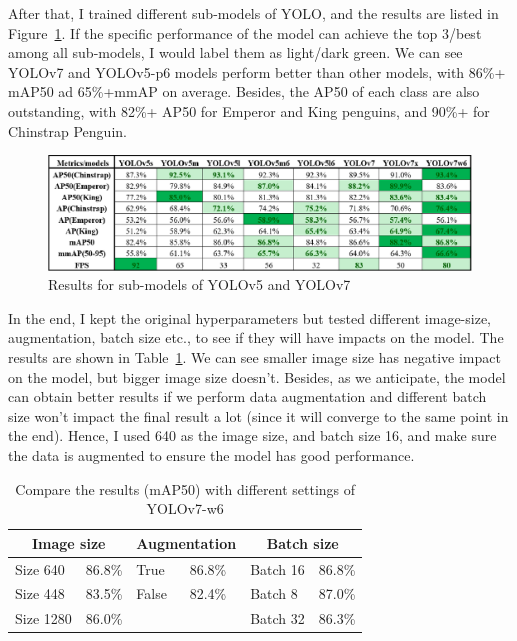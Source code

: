 \documentclass[runningheads]{llncs}
\begin{document}
After that, I trained different sub-models of YOLO, and the results are listed in Figure~\ref{fig1}. If the specific performance of the model can achieve the top 3/best among all sub-models, I would label them as light/dark green. We can see YOLOv7 and YOLOv5-p6 models perform better than other models, with 86\%+ mAP50 ad 65\%+mmAP on average. Besides, the AP50 of each class are also outstanding, with 82\%+ AP50 for Emperor and King penguins, and 90\%+ for Chinstrap Penguin.

\begin{figure}
\includegraphics[width=\textwidth]{result.eps}
\caption{Results for sub-models of YOLOv5 and YOLOv7} \label{fig1}
\end{figure}


In the end, I kept the original hyperparameters but tested different image-size, augmentation, batch size etc., to see if they will have impacts on the model. The results are shown in Table~\ref{tab2}. We can see smaller image size has negative impact on the model, but bigger image size doesn't. Besides, as we anticipate, the model can obtain better results if we perform data augmentation and different batch size won't impact the final result a lot (since it will converge to the same point in the end). Hence, I used 640 as the image size, and batch size 16, and make sure the data is augmented to ensure the model has good performance.
\begin{table}
\centering
\caption{Compare the results (mAP50) with different settings of YOLOv7-w6}\label{tab2}
\begin{tabular}{p{2cm}p{1cm}|p{1.2cm}p{1cm}|p{2cm}p{1cm}}
\hline
\multicolumn{2}{c}{\textbf{Image size}} & \multicolumn{2}{c}{\textbf{Augmentation}} & \multicolumn{2}{c}{\textbf{Batch size}} \\
\hline
Size 640 & 86.8\% &  True & 86.8\% &  Batch 16 & 86.8\% \\
Size 448 & 83.5\% &  False & 82.4\% &  Batch 8 & 87.0\% \\
Size 1280 & 86.0\% &   &  &  Batch 32 & 86.3\% \\
\hline
\end{tabular}
\end{table}
\end{document}
